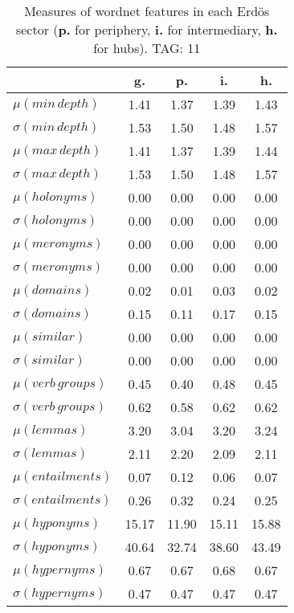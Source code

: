 \begin{table}[h!]
\begin{center}
\begin{tabular}{| l || c | c | c | c |}\hline
 & {\bf g.} & {\bf p.} & {\bf i.} & {\bf h.} \\\hline\hline
$\mu(min\,depth)$ & 1.41  & 1.37  & 1.39  & 1.43 \\
$\sigma(min\,depth)$ & 1.53  & 1.50  & 1.48  & 1.57 \\\hline
$\mu(max\,depth)$ & 1.41  & 1.37  & 1.39  & 1.44 \\
$\sigma(max\,depth)$ & 1.53  & 1.50  & 1.48  & 1.57 \\\hline
$\mu(holonyms)$ & 0.00  & 0.00  & 0.00  & 0.00 \\
$\sigma(holonyms)$ & 0.00  & 0.00  & 0.00  & 0.00 \\\hline
$\mu(meronyms)$ & 0.00  & 0.00  & 0.00  & 0.00 \\
$\sigma(meronyms)$ & 0.00  & 0.00  & 0.00  & 0.00 \\\hline
$\mu(domains)$ & 0.02  & 0.01  & 0.03  & 0.02 \\
$\sigma(domains)$ & 0.15  & 0.11  & 0.17  & 0.15 \\\hline
$\mu(similar)$ & 0.00  & 0.00  & 0.00  & 0.00 \\
$\sigma(similar)$ & 0.00  & 0.00  & 0.00  & 0.00 \\\hline
$\mu(verb\,groups)$ & 0.45  & 0.40  & 0.48  & 0.45 \\
$\sigma(verb\,groups)$ & 0.62  & 0.58  & 0.62  & 0.62 \\\hline
$\mu(lemmas)$ & 3.20  & 3.04  & 3.20  & 3.24 \\
$\sigma(lemmas)$ & 2.11  & 2.20  & 2.09  & 2.11 \\\hline
$\mu(entailments)$ & 0.07  & 0.12  & 0.06  & 0.07 \\
$\sigma(entailments)$ & 0.26  & 0.32  & 0.24  & 0.25 \\\hline
$\mu(hyponyms)$ & 15.17  & 11.90  & 15.11  & 15.88 \\
$\sigma(hyponyms)$ & 40.64  & 32.74  & 38.60  & 43.49 \\\hline
$\mu(hypernyms)$ & 0.67  & 0.67  & 0.68  & 0.67 \\
$\sigma(hypernyms)$ & 0.47  & 0.47  & 0.47  & 0.47 \\\hline
\end{tabular}
\caption{Measures of wordnet features in each Erd\"os sector ({{\bf p.}} for periphery, {{\bf i.}} for intermediary, {{\bf h.}} for hubs). TAG: 11}
\end{center}
\end{table}